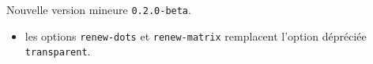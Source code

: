 Nouvelle version mineure \verb+0.2.0-beta+.

\begin{itemize}[itemsep=.5em]
    \item {}
          les options \verb#renew-dots# et \verb#renew-matrix# remplacent l'option dépréciée \verb#transparent#.


\end{itemize}

\separation

